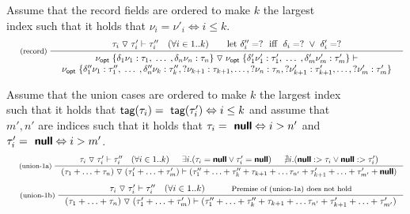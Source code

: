 \documentclass[10pt]{sigplanconf}
\newcommand{\tsep}[0]{\; \triangledown \;}
\newcommand{\kvd}[1]{\textbf{\sffamily #1}}
\newcommand{\ident}[1]{\textnormal{\sffamily #1}}
\newcommand{\tytagof}{\ident{tag}}
\begin{document}

\begin{figure}[t]
\vspace{-2em}
\small{
Assume that the record fields are ordered to make $k$ the largest index such that
it holds that $\nu_i = \nu'_i \Leftrightarrow i \leq k$.
}
\begin{equation*}
\inference[(record)\;]
  { \tau_i \tsep \tau'_i \vdash  \tau''_i \quad (\forall i \in 1 .. k) \quad\quad
    \textnormal{let}~\delta''_i = ?~$ iff $~\delta_i = ? ~\vee~ \delta'_i = ? }
  { \begin{array}{c}
    \nu_{\ident{opt}} \; \{ \delta_1 \nu_1 : \tau_1, \; \ldots \; , \delta_n \nu_n : \tau_n \} \tsep
    \nu_{\ident{opt}} \; \{ \delta'_1 \nu'_1 : \tau'_1, \; \ldots \; , \delta'_m \nu'_m : \tau'_m \} \vdash\\
    \nu_{\ident{opt}} \; \{ \delta''_1 \nu_1 : \tau''_1, \; \ldots \; , \delta''_n \nu_k : \tau''_k,
                            ?\nu_{k+1} : \tau_{k+1}, \ldots, ?\nu_n : \tau_n,
                            ?\nu'_{k+1} : \tau'_{k+1}, \ldots, ?\nu'_m : \tau'_m \}
    \end{array} }
\end{equation*}
\vspace{0.5em}

\small{
Assume that the union cases are ordered to make $k$ the largest index such that it holds that 
$\tytagof(\tau_i) = \tytagof(\tau'_i) \Leftrightarrow i \leq k$\newline
and assume that $m', n'$ are indices such that it holds that $\tau_i = \kvd{null} \Leftrightarrow i > n'$ and
$\tau_i' = \kvd{null} \Leftrightarrow i > m'$.
}
\begin{equation*}
\inference[(union-1a)\;]
  { \tau_i \tsep \tau'_i \vdash  \tau''_i \quad (\forall i \in 1 .. k) &
    \exists i. (\tau_i = \kvd{null} \vee \tau_i' = \kvd{null}) &
    \nexists i. (\kvd{null} :> \tau_i \vee \kvd{null} :> \tau_i') }
  { (\tau_1 + \ldots + \tau_n) \tsep (\tau'_1 + \ldots + \tau'_m) \vdash
    (\tau''_1 + \ldots + \tau''_k +
    \tau_{k+1} + \ldots \tau_{n'} + \tau'_{k+1} + \ldots + \tau'_{m'} + \kvd{null}) }
\end{equation*}
\begin{equation*}
\inference[(union-1b)\;]
  { \tau_i \tsep \tau'_i \vdash  \tau''_i \quad (\forall i \in 1 .. k) &
  	\textnormal{\footnotesize Premise of (union-1a) does not hold} }
  { (\tau_1 + \ldots + \tau_n) \tsep (\tau'_1 + \ldots + \tau'_m) \vdash
    (\tau''_1 + \ldots + \tau''_k +
    \tau_{k+1} + \ldots \tau_{n'} + \tau'_{k+1} + \ldots + \tau'_{m'}) }
\end{equation*}
\vspace{0.5em}


\end{figure}
\end{document}
